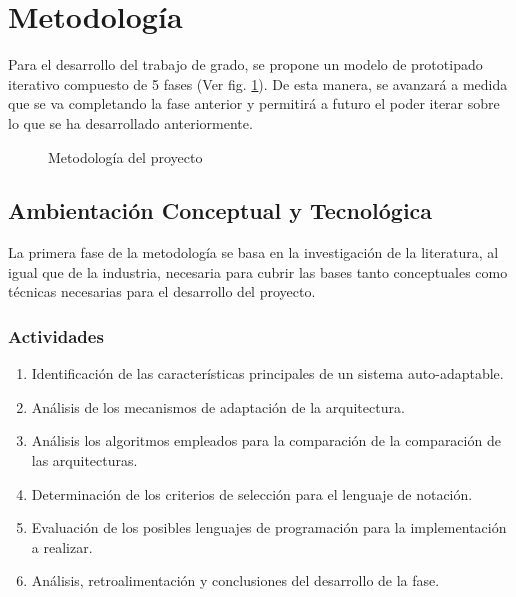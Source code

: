 \documentclass[12pt]{article}
\begin{document}


\pagebreak

\section{Metodología}

Para el desarrollo del trabajo de grado, se propone un modelo de prototipado iterativo compuesto de 5 fases (Ver fig. \ref{fig:met}). De esta manera, se avanzará a medida que se va completando la fase anterior y permitirá a futuro el poder iterar sobre lo que se ha desarrollado anteriormente.

\begin{figure}[H]
	\centering
	
	\caption{Metodología del proyecto}
	\label{fig:met}
\end{figure}

\subsection{Ambientación Conceptual y Tecnológica}

La primera fase de la metodología se basa en la investigación de la literatura, al igual que de la industria, necesaria para cubrir las bases tanto conceptuales como técnicas necesarias para el desarrollo del proyecto.

\subsubsection*{Actividades}

\begin{enumerate}[label=\thesubsection.\arabic*., wide, labelindent=2em, leftmargin=5em]
	\item Identificación de las características principales de un sistema auto-adaptable.
	\item Análisis de los mecanismos de adaptación de la arquitectura.
	\item Análisis los algoritmos empleados para la comparación de la comparación de las arquitecturas.
	\item Determinación de los criterios de selección para el lenguaje de notación.
	\item Evaluación de los posibles lenguajes de programación para la implementación a realizar.
	\item Análisis, retroalimentación y conclusiones del desarrollo de la fase.
\end{enumerate}
\end{document}

